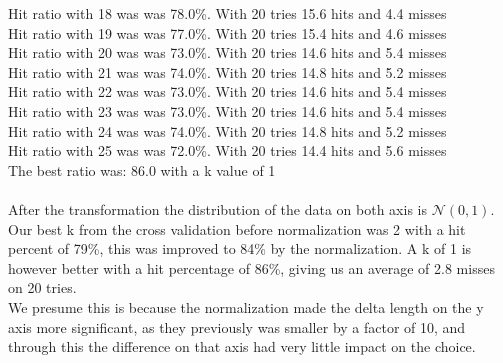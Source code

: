 \documentclass{article}
\begin{document}
Hit ratio with 18 was  was 78.0\%. With 20 tries 15.6 hits and 4.4 misses\\
Hit ratio with 19 was  was 77.0\%. With 20 tries 15.4 hits and 4.6 misses\\
Hit ratio with 20 was  was 73.0\%. With 20 tries 14.6 hits and 5.4 misses\\
Hit ratio with 21 was  was 74.0\%. With 20 tries 14.8 hits and 5.2 misses\\
Hit ratio with 22 was  was 73.0\%. With 20 tries 14.6 hits and 5.4 misses\\
Hit ratio with 23 was  was 73.0\%. With 20 tries 14.6 hits and 5.4 misses\\
Hit ratio with 24 was  was 74.0\%. With 20 tries 14.8 hits and 5.2 misses\\
Hit ratio with 25 was  was 72.0\%. With 20 tries 14.4 hits and 5.6 misses\\
The best ratio was: 86.0 with a k value of 1\\\\
After the transformation the distribution of the data on both axis is $\mathscr{N}(0,1)$. Our best k from the 
cross validation before normalization was 2 with a hit percent of 79\%, this was improved to 84\% by the normalization. 
A k of 1 is however better with a hit percentage of 86\%, giving us an average of 2.8 misses on 20 tries.\\
We presume this is because the normalization made the delta length on the y axis more significant, as they previously was smaller by a factor of 10,
and through this the difference on that axis had very little impact on the choice.
\end{document}
